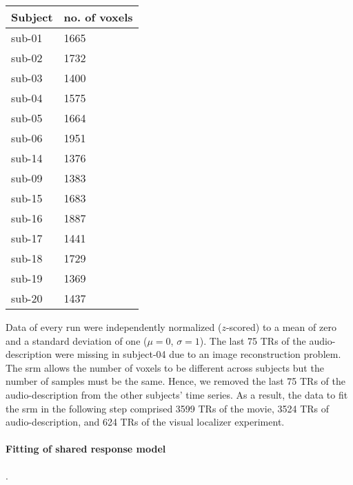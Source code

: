 \begin{table*}[btp]
    \caption{Number of remaining voxels after each subject's brain was masked
    with the union of individual \acp{ppa} that was warped from MNI space into
    each individual's subjects-space and a subject's-specific FoV from AO study.}

\label{tab:ppamaskvoxels}
\begin{tabular}{ll}
\toprule
\textbf{Subject} & \textbf{no. of voxels} \\
\midrule
sub-01 & 1665 \tabularnewline
sub-02 & 1732 \tabularnewline
sub-03 & 1400 \tabularnewline
sub-04 & 1575 \tabularnewline
sub-05 & 1664 \tabularnewline
sub-06 & 1951 \tabularnewline
sub-14 & 1376 \tabularnewline
sub-09 & 1383 \tabularnewline
sub-15 & 1683 \tabularnewline
sub-16 & 1887 \tabularnewline
sub-17 & 1441 \tabularnewline
sub-18 & 1729 \tabularnewline
sub-19 & 1369 \tabularnewline
sub-20 & 1437 \tabularnewline
\bottomrule
\end{tabular}
\end{table*}

Data of every run were independently normalized ($z$-scored) to a mean of zero
and a standard deviation of one ($\mu=0$, $\sigma=1$).
%
The last 75 TRs of the audio-description were missing in subject-04 due to an
image reconstruction problem.
%
The \ac{srm} allows the number of voxels to be different across subjects but the
number of samples must be the same.
%
Hence, we removed the last 75 TRs of the audio-description from the other
subjects' time series.
As a result, the data to fit the \ac{srm} in the following step comprised 3599
TRs of the movie, 3524 TRs of audio-description, and 624 TRs of the visual
localizer experiment.



\paragraph{Fitting of shared response model}

.

